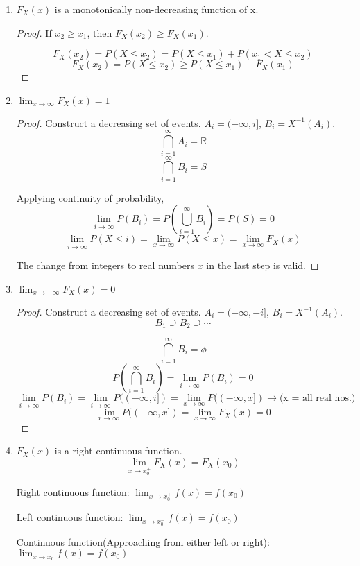 \documentclass{article}
\begin{document}
\begin{enumerate}
    \item $F_X(x)$ is a monotonically non-decreasing function of x.
    \begin{proof}
        If $x_2 \geq x_1$, then $F_X(x_2) \geq F_X(x_1)$.

        $$F_X(x_2) = P(X \leq x_2)= P(X \leq x_1)+P(x_1 < X \leq x_2)$$
        $$F_X(x_2) = P(X \leq x_2) \geq P(X \leq x_1) -F_X(x_1) $$

    \end{proof}

    \item $\lim_{x \to \infty} F_X(x)= 1$

    \begin{proof}
        Construct a decreasing set of events. $A_i= (-\infty, i]$, $B_i = X^{-1}(A_i)$.
        $$ \bigcap_{i=1}^{\infty}A_i= \mathbb{R}$$
        $$ \bigcap_{i=1}^{\infty}B_i= S $$

        Applying continuity of probability,
        $$ \lim_{i \to \infty}P(B_i)= P(\bigcup_{i=1}^{\infty}B_i) =P(S) = 0$$
        $$ \lim_{i \to \infty}P(X \leq i)= \lim_{x \to \infty}P(X \leq x) = \lim_{x \to \infty} F_X(x)$$

        The change from integers to real numbers $x$ in the last step is valid.

    \end{proof}
    \item $\lim_{x \to -\infty} F_X(x)= 0$
    \begin{proof}
        Construct a decreasing set of events. $A_i= (-\infty, -i]$, $B_i = X^{-1}(A_i)$.
       $$ B_1 \supseteq B_2 \supseteq \cdots$$

       $$ \bigcap_{i=1}^{\infty}B_i= \phi $$
       $$ P(\bigcap_{i=1}^{\infty}B_i) = \lim_{i \to \infty}P(B_i)= 0$$
       $$  \lim_{i \to \infty}P(B_i) =  \lim_{i \to \infty}P((-\infty,i])= \lim_{x \to \infty}P((-\infty,x]) \rightarrow \text{(x = all real nos.)}$$
       $$ \lim_{x \to \infty}P((-\infty,x]) = \lim_{x \to \infty}F_X(x)= 0$$
    \end{proof}
    \item $F_X(x)$ is a right continuous function.
    $$ \lim_{x \to x_0^+} F_X(x)= F_X(x_0)$$

    Right continuous function: $\lim_{x \to x_0^+} f(x)= f(x_0)$

    Left continuous function: $\lim_{x \to x_0^-} f(x)= f(x_0)$

    Continuous function(Approaching from either left or right): $\lim_{x \to x_0} f(x)= f(x_0)$


\end{enumerate}
\end{document}
